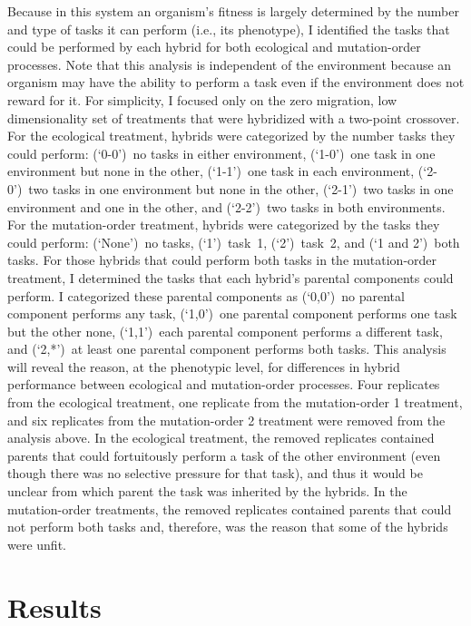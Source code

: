 \begin{doublespace}
Because in this system an organism's fitness is largely determined
by the number and type of tasks it can perform (i.e., its phenotype),
I identified the tasks that could be performed by each hybrid
for both ecological and mutation-order processes.
%
Note that this analysis is independent of the environment
because an organism may have the ability to perform a task
even if the environment does not reward for it.
%
For simplicity, I focused only on
the zero migration, low dimensionality set of treatments
that were hybridized with a two-point crossover.
%
For the ecological treatment,
hybrids were categorized by the number tasks they could perform:
(`\mbox{0-0}')~no tasks in either environment,
(`\mbox{1-0}')~one task in one environment but none in the other,
(`\mbox{1-1}')~one task in each environment,
(`\mbox{2-0}')~two tasks in one environment but none in the other,
(`\mbox{2-1}')~two tasks in one environment and one in the other,
and (`\mbox{2-2}')~two tasks in both environments.
%
For the mutation-order treatment,
hybrids were categorized by the tasks they could perform:
(`None')~no tasks,
(`1')~task~1,
(`2')~task~2,
and (`1 and 2')~both tasks.
%
For those hybrids that could perform both tasks
in the mutation-order treatment,
I determined the tasks that each hybrid's parental components could perform.
%
I categorized these parental components as
(`0,0')~no parental component performs any task,
(`1,0')~one parental component performs one task but the other none,
(`1,1')~each parental component performs a different task,
and (`2,*')~at least one parental component performs both tasks.
%
This analysis will reveal the reason, at the phenotypic level,
for differences in hybrid performance between ecological
and mutation-order processes.
%
Four replicates from the ecological treatment,
one replicate from the mutation-order 1 treatment,
and six replicates from the mutation-order 2 treatment
were removed from the analysis above.
%
In the ecological treatment, the removed replicates contained parents
that could fortuitously perform a task of the other environment
(even though there was no selective pressure for that task),
and thus it would be unclear from which parent the task was inherited
by the hybrids.
%
In the mutation-order treatments, the removed replicates contained parents
that could not perform both tasks and, therefore, was the reason
that some of the hybrids were unfit.



\section{Results}


\end{doublespace}
